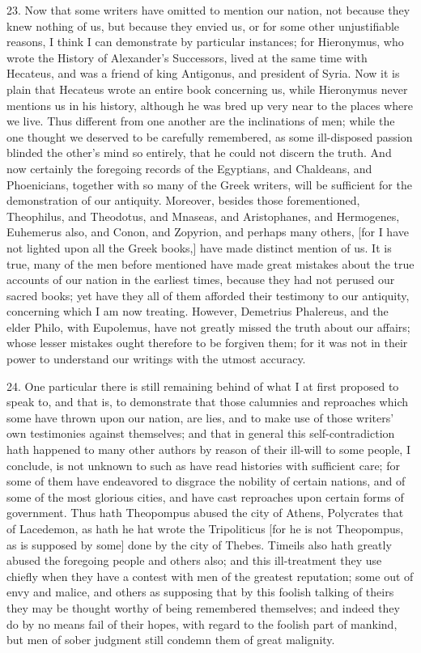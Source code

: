 23. Now that some writers have omitted to mention our nation, not because
they knew nothing of us, but because they envied us, or for some other
unjustifiable reasons, I think I can demonstrate by particular instances;
for Hieronymus, who wrote the History of Alexander's Successors, lived at
the same time with Hecateus, and was a friend of king Antigonus, and
president of Syria. Now it is plain that Hecateus wrote an entire book
concerning us, while Hieronymus never mentions us in his history, although
he was bred up very near to the places where we live. Thus different from
one another are the inclinations of men; while the one thought we deserved
to be carefully remembered, as some ill-disposed passion blinded the
other's mind so entirely, that he could not discern the truth. And now
certainly the foregoing records of the Egyptians, and Chaldeans, and
Phoenicians, together with so many of the Greek writers, will be
sufficient for the demonstration of our antiquity. Moreover, besides those
forementioned, Theophilus, and Theodotus, and Mnaseas, and Aristophanes,
and Hermogenes, Euhemerus also, and Conon, and Zopyrion, and perhaps many
others, [for I have not lighted upon all the Greek books,] have made
distinct mention of us. It is true, many of the men before mentioned have
made great mistakes about the true accounts of our nation in the earliest
times, because they had not perused our sacred books; yet have they all of
them afforded their testimony to our antiquity, concerning which I am now
treating. However, Demetrius Phalereus, and the elder Philo, with
Eupolemus, have not greatly missed the truth about our affairs; whose
lesser mistakes ought therefore to be forgiven them; for it was not in
their power to understand our writings with the utmost accuracy.

24. One particular there is still remaining behind of what I at first
proposed to speak to, and that is, to demonstrate that those calumnies and
reproaches which some have thrown upon our nation, are lies, and to make
use of those writers' own testimonies against themselves; and that in
general this self-contradiction hath happened to many other authors by
reason of their ill-will to some people, I conclude, is not unknown to
such as have read histories with sufficient care; for some of them have
endeavored to disgrace the nobility of certain nations, and of some of the
most glorious cities, and have cast reproaches upon certain forms of
government. Thus hath Theopompus abused the city of Athens, Polycrates
that of Lacedemon, as hath he hat wrote the Tripoliticus [for he is not
Theopompus, as is supposed by some] done by the city of Thebes. Timeils
also hath greatly abused the foregoing people and others also; and this
ill-treatment they use chiefly when they have a contest with men of the
greatest reputation; some out of envy and malice, and others as supposing
that by this foolish talking of theirs they may be thought worthy of being
remembered themselves; and indeed they do by no means fail of their hopes,
with regard to the foolish part of mankind, but men of sober judgment
still condemn them of great malignity.

